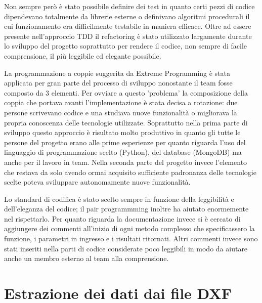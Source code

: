 \documentclass[12pt]{report}
\begin{document}
Non sempre però è stato possibile definire dei test in quanto certi pezzi di codice dipendevano totalmente da librerie esterne o definivano algoritmi procedurali il cui funzionamento era difficilmente testabile in maniera efficace. 
Oltre ad essere presente nell'approccio TDD il refactoring è stato utilizzato largamente durante lo sviluppo del progetto soprattutto per rendere il codice, non sempre di facile comprensione, il più leggibile ed elegante possibile.

La programmazione a coppie suggerita da Extreme Programming è stata applicata per gran parte del processo di sviluppo nonostante il team fosse composto da 3 elementi. Per ovviare a questo 'problema' la composizione della coppia che portava avanti l'implementazione è stata decisa a rotazione: due persone scrivevano codice e una studiava nuove funzionalità o migliorava la propria conoscenza delle tecnologie utilizzate. Soprattutto nella prima parte di sviluppo questo approccio è risultato molto produttivo in quanto gli tutte le persone del progetto erano alle prime esperienze per quanto riguarda l'uso del linguaggio di programmazione scelto (Python), del database (MongoDB) ma anche per il lavoro in team. Nella seconda parte del progetto invece l'elemento che restava da solo avendo ormai acquisito sufficiente padronanza delle tecnologie scelte poteva sviluppare autonomamente nuove funzionalità.

Lo standard di codifica è stato scelto sempre in funzione della leggibilità e dell'eleganza del codice; il pair programmming inoltre ha aiutato enormemente nel rispettarlo. Per quanto riguarda la documentazione invece si è cercato di aggiungere dei commenti all'inizio di ogni metodo complesso che specificassero la funzione, i parametri in ingresso e i risultati ritornati. Altri commenti invece sono stati inseriti nella parti di codice considerate poco leggibili in modo da aiutare anche un membro esterno al team alla comprensione.   

\newpage
\section{Estrazione dei dati dai file DXF}
\end{document}
